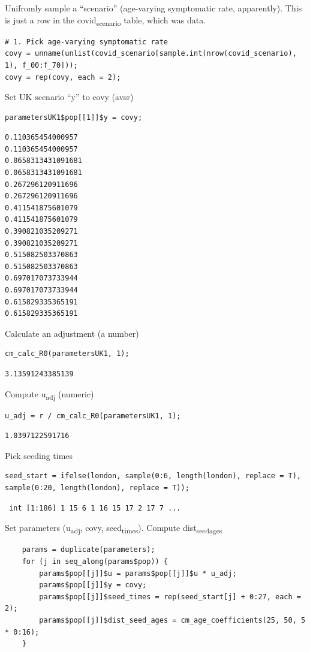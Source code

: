 \documentclass[11pt]{article}
\begin{document}
Unifromly sample a ``scenario'' (age-varying symptomatic rate, apparently).
This is just a row in the covid\textsubscript{scenario} table, which was data.
\begin{verbatim}
# 1. Pick age-varying symptomatic rate
covy = unname(unlist(covid_scenario[sample.int(nrow(covid_scenario), 1), f_00:f_70]));
covy = rep(covy, each = 2);
\end{verbatim}

Set UK scenario ``y'' to covy (avsr)
\begin{verbatim}
parametersUK1$pop[[1]]$y = covy;
\end{verbatim}

\begin{verbatim}
0.110365454000957
0.110365454000957
0.0658313431091681
0.0658313431091681
0.267296120911696
0.267296120911696
0.411541875601079
0.411541875601079
0.390821035209271
0.390821035209271
0.515082503370863
0.515082503370863
0.697017073733944
0.697017073733944
0.615829335365191
0.615829335365191
\end{verbatim}

Calculate an adjustment (a number)
\begin{verbatim}
cm_calc_R0(parametersUK1, 1);
\end{verbatim}

\begin{verbatim}
3.13591243385139
\end{verbatim}

Compute u\textsubscript{adj} (numeric)
\begin{verbatim}
u_adj = r / cm_calc_R0(parametersUK1, 1);
\end{verbatim}

\begin{verbatim}
1.0397122591716
\end{verbatim}

Pick seeding times
\begin{verbatim}
seed_start = ifelse(london, sample(0:6, length(london), replace = T), sample(0:20, length(london), replace = T));
\end{verbatim}

\begin{verbatim}
 int [1:186] 1 15 6 1 16 15 17 2 17 7 ...
\end{verbatim}

Set parameters (u\textsubscript{adj}, covy, seed\textsubscript{times}). Compute dist\textsubscript{seed}\textsubscript{ages}
\begin{verbatim}
    params = duplicate(parameters);
    for (j in seq_along(params$pop)) {
        params$pop[[j]]$u = params$pop[[j]]$u * u_adj;
        params$pop[[j]]$y = covy;
        params$pop[[j]]$seed_times = rep(seed_start[j] + 0:27, each = 2);
        params$pop[[j]]$dist_seed_ages = cm_age_coefficients(25, 50, 5 * 0:16);
    }
\end{verbatim}
\end{document}
